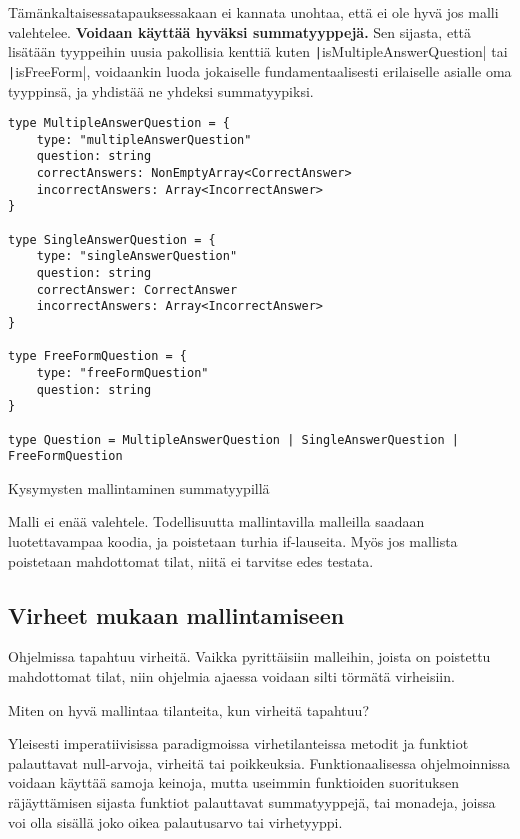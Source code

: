 Tämänkaltaisessatapauksessakaan ei kannata unohtaa, että ei ole hyvä jos malli valehtelee. \textbf{Voidaan käyttää hyväksi summatyyppejä.} Sen sijasta, että lisätään tyyppeihin uusia pakollisia kenttiä kuten \texttt|isMultipleAnswerQuestion| tai \texttt|isFreeForm|, voidaankin luoda jokaiselle fundamentaalisesti erilaiselle asialle oma tyyppinsä, ja yhdistää ne yhdeksi summatyypiksi.

\begin{code}
    \begin{verbatim}
type MultipleAnswerQuestion = {
    type: "multipleAnswerQuestion"
    question: string
    correctAnswers: NonEmptyArray<CorrectAnswer>
    incorrectAnswers: Array<IncorrectAnswer>
}

type SingleAnswerQuestion = {
    type: "singleAnswerQuestion"
    question: string
    correctAnswer: CorrectAnswer
    incorrectAnswers: Array<IncorrectAnswer>
}

type FreeFormQuestion = {
    type: "freeFormQuestion"
    question: string
}

type Question = MultipleAnswerQuestion | SingleAnswerQuestion | FreeFormQuestion
    \end{verbatim}
    \caption{Kysymysten mallintaminen summatyypillä}
    \label{code:ts_sum_type_nice}
\end{code}

Malli ei enää valehtele. Todellisuutta mallintavilla malleilla saadaan luotettavampaa koodia, ja poistetaan turhia if-lauseita. Myös jos mallista poistetaan mahdottomat tilat, niitä ei tarvitse edes testata.

\subsection{Virheet mukaan mallintamiseen}

Ohjelmissa tapahtuu virheitä. Vaikka pyrittäisiin malleihin, joista on poistettu mahdottomat tilat, niin ohjelmia ajaessa voidaan silti törmätä virheisiin.

Miten on hyvä mallintaa tilanteita, kun virheitä tapahtuu?

Yleisesti imperatiivisissa paradigmoissa virhetilanteissa metodit ja funktiot palauttavat null-arvoja, virheitä tai poikkeuksia.
Funktionaalisessa ohjelmoinnissa voidaan käyttää samoja keinoja, mutta useimmin funktioiden suorituksen räjäyttämisen sijasta funktiot palauttavat summatyyppejä, tai monadeja, joissa voi olla sisällä joko oikea palautusarvo tai virhetyyppi.

